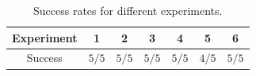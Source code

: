 \begin{table}[H]
\begin{center}
\renewcommand{\arraystretch}{1.5}
\begin{tabular}{|c | c | c | c | c | c | c |} 
 \hline
Experiment & 1 &  2 & 3 & 4 & 5 & 6 \\[0.5ex] 
 \hline
Success & $5 / 5$ & $5 / 5$ & $5 / 5$ & $5 / 5$ & $4 / 5$ & $5 / 5$ \\ 
 \hline
\end{tabular}

\caption{\label{table:spill} Success rates for different experiments.}
\end{center}
\end{table}
